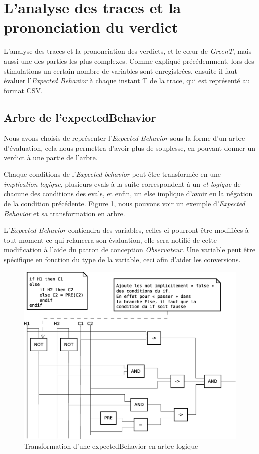 \section{L'analyse des traces et la prononciation du verdict}
	L'analyse des traces et la prononciation des verdicts, et le c\oe{}ur de \textit{GreenT}, mais aussi une des parties les plus complexes. Comme expliqué précédemment, lors des stimulations un certain nombre de variables sont enregistrées, ensuite il faut évaluer l'\textit{Expected Behavior} à chaque instant T de la trace, qui est représenté au format CSV. 

	\subsection{Arbre de l'expectedBehavior}
 	Nous avons choisis de représenter l'\textit{Expected Behavior} sous la forme d'un arbre d'évaluation, cela nous permettra d'avoir plus de souplesse, en pouvant donner un verdict à une partie de l'arbre.

 	Chaque conditions de l'\textit{Expected behavior} peut être transformée en une \textit{implication logique}, plusieurs evals à la suite correspondent à un \textit{et logique} de chacune des conditions des evals, et enfin, un else implique d'avoir eu la négation de la condition précédente. Figure \ref{fig:diagLogique}, nous pouvons voir un exemple d'\textit{Expected Behavior} et sa transformation en arbre.


L'\textit{Expected Behavior} contiendra des variables, celles-ci pourront être modifiées à tout moment ce qui relancera son évaluation, elle sera notifié de cette modification à l'aide du patron de conception \textit{Observateur}. Une variable peut être spécifique en fonction du type de la variable, ceci afin d'aider les conversions.

 	\begin{figure}[H]
 		\centering
 		\includegraphics[width=14cm]{contents/images/diagLogique.eps}
 		\caption{Transformation d'une expectedBehavior en arbre logique}
 		\label{fig:diagLogique}
 	\end{figure}

